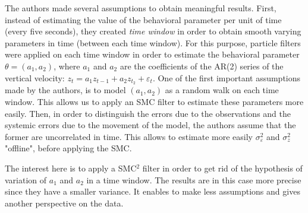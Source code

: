 The authors made several assumptions to obtain meaningful results. First, instead of estimating the value of the behavioral parameter per unit of time (every five seconds), they created \textit{time window} in order to obtain smooth varying parameters in time (between each time window). For this purpose, particle filters were applied on each time window in order to estimate the behavioral parameter $\theta = (a_1, a_2)$, where $a_1$ and $a_2$ are the coefficients of the AR(2) series of the vertical velocity: $z_t = a_1z_{t-1} + a_2z_{t_2} + \varepsilon_t$. One of the first important assumptions made by the authors, is to model $(a_1, a_2)$  as a random walk on each time window. This allows us to apply an SMC filter to estimate these parameters more easily. Then, in order to distinguish the errors due to the observations and the systemic errors due to the movement of the model, the authors assume that the former are uncorrelated in time. This allows to estimate more easily $\sigma_\varepsilon^2$ and $\sigma_z^2$ "offline", before applying the SMC.

The interest here is to apply a SMC$^2$ filter in order to get rid of the hypothesis of variation of $a_1$ and $a_2$ in a time window. The results are in this case more precise since they have a smaller variance. It enables to make less assumptions and gives another perspective on the data.

